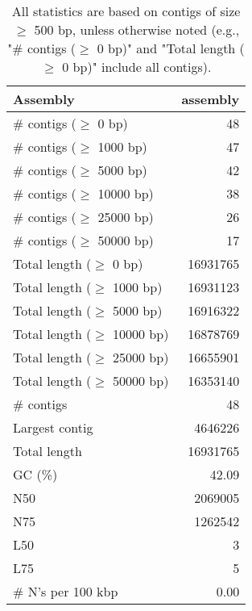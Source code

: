 \documentclass[12pt,a4paper]{article}
\begin{document}
\begin{table}[ht]
\begin{center}
\caption{All statistics are based on contigs of size $\geq$ 500 bp, unless otherwise noted (e.g., "\# contigs ($\geq$ 0 bp)" and "Total length ($\geq$ 0 bp)" include all contigs).}
\begin{tabular}{|l*{1}{|r}|}
\hline
Assembly & assembly \\ \hline
\# contigs ($\geq$ 0 bp) & 48 \\ \hline
\# contigs ($\geq$ 1000 bp) & 47 \\ \hline
\# contigs ($\geq$ 5000 bp) & 42 \\ \hline
\# contigs ($\geq$ 10000 bp) & 38 \\ \hline
\# contigs ($\geq$ 25000 bp) & 26 \\ \hline
\# contigs ($\geq$ 50000 bp) & 17 \\ \hline
Total length ($\geq$ 0 bp) & 16931765 \\ \hline
Total length ($\geq$ 1000 bp) & 16931123 \\ \hline
Total length ($\geq$ 5000 bp) & 16916322 \\ \hline
Total length ($\geq$ 10000 bp) & 16878769 \\ \hline
Total length ($\geq$ 25000 bp) & 16655901 \\ \hline
Total length ($\geq$ 50000 bp) & 16353140 \\ \hline
\# contigs & 48 \\ \hline
Largest contig & 4646226 \\ \hline
Total length & 16931765 \\ \hline
GC (\%) & 42.09 \\ \hline
N50 & 2069005 \\ \hline
N75 & 1262542 \\ \hline
L50 & 3 \\ \hline
L75 & 5 \\ \hline
\# N's per 100 kbp & 0.00 \\ \hline
\end{tabular}
\end{center}
\end{table}
\end{document}
